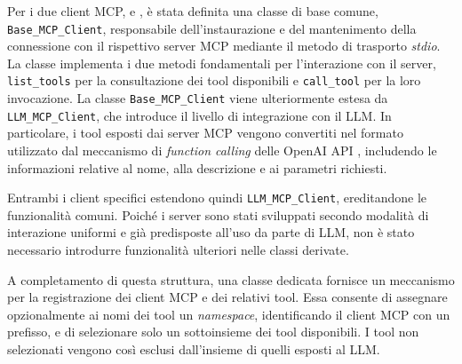Per i due client MCP, \sandmcpclient{} e \sremcpclient{}, è stata definita una classe di base comune, \texttt{Base\_MCP\_Client}, responsabile dell'instaurazione e del mantenimento della connessione con il rispettivo server MCP mediante il metodo di trasporto \emph{stdio}. La classe implementa i due metodi fondamentali per l'interazione con il server, \texttt{list\_tools} per la consultazione dei tool disponibili e \texttt{call\_tool} per la loro invocazione. La classe \texttt{Base\_MCP\_Client} viene ulteriormente estesa da \texttt{LLM\_MCP\_Client}, che introduce il livello di integrazione con il LLM. In particolare, i tool esposti dai server MCP vengono convertiti nel formato utilizzato dal meccanismo di \emph{function calling} delle OpenAI API \cite{openai2026apidocs}, includendo le informazioni relative al nome, alla descrizione e ai parametri richiesti.





Entrambi i client specifici estendono quindi \texttt{LLM\_MCP\_Client}, ereditandone le funzionalità comuni. Poiché i server sono stati sviluppati secondo modalità di interazione uniformi e già predisposte all'uso da parte di LLM, non è stato necessario introdurre funzionalità ulteriori nelle classi derivate.


A completamento di questa struttura, una classe dedicata fornisce un meccanismo per la registrazione dei client MCP e dei relativi tool. Essa consente di assegnare opzionalmente ai nomi dei tool un \emph{namespace}, identificando il client MCP con un prefisso, e di selezionare solo un sottoinsieme dei tool disponibili. I tool non selezionati vengono così esclusi dall'insieme di quelli esposti al LLM. %

